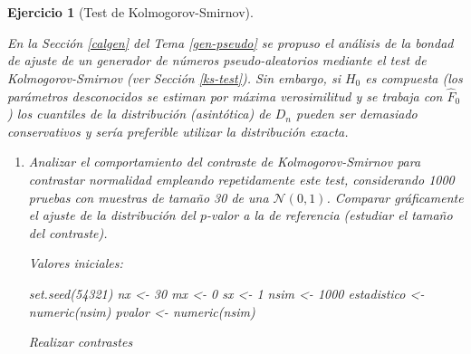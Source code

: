 \documentclass[
]{book}
\newenvironment{Shaded}{\begin{snugshade}}{\end{snugshade}}
\newcommand{\ControlFlowTok}[1]{\textcolor[rgb]{0.13,0.29,0.53}{\textbf{#1}}}
\newcommand{\DecValTok}[1]{\textcolor[rgb]{0.00,0.00,0.81}{#1}}
\newcommand{\FunctionTok}[1]{\textcolor[rgb]{0.00,0.00,0.00}{#1}}
\newcommand{\NormalTok}[1]{#1}
\newcommand{\OtherTok}[1]{\textcolor[rgb]{0.56,0.35,0.01}{#1}}
\newcommand{\SpecialCharTok}[1]{\textcolor[rgb]{0.00,0.00,0.00}{#1}}
\newcommand{\StringTok}[1]{\textcolor[rgb]{0.31,0.60,0.02}{#1}}
\theoremstyle{break}
\newtheorem{exercise}{Ejercicio}[chapter]
\theoremstyle{nonumberplain}
\begin{document}
\begin{exercise}[Test de Kolmogorov-Smirnov]
\protect\hypertarget{exr:ks-test-sim}{}\label{exr:ks-test-sim}

En la Sección \ref{calgen} del Tema \ref{gen-pseudo} se propuso el análisis de la bondad de ajuste de un generador de números pseudo-aleatorios mediante el test de Kolmogorov-Smirnov (ver Sección \ref{ks-test}).
Sin embargo, si \(H_{0}\) es compuesta (los parámetros desconocidos se estiman por máxima verosimilitud y se trabaja con \(\hat{F}_{0}\)) los cuantiles de la distribución (asintótica) de \(D_{n}\) pueden ser demasiado conservativos y sería preferible utilizar la distribución exacta.

\begin{enumerate}
\def\labelenumi{\alph{enumi})}
\item
  Analizar el comportamiento del contraste de Kolmogorov-Smirnov
  para contrastar normalidad empleando repetidamente este test,
  considerando 1000 pruebas con muestras de tamaño 30 de
  una \(\mathcal{N}(0,1)\). Comparar gráficamente el ajuste
  de la distribución del \(p\)-valor a la de referencia
  (estudiar el tamaño del contraste).

  Valores iniciales:

\begin{Shaded}
\begin{Highlighting}[]
\FunctionTok{set.seed}\NormalTok{(}\DecValTok{54321}\NormalTok{)}
\NormalTok{nx }\OtherTok{\textless{}{-}} \DecValTok{30}
\NormalTok{mx }\OtherTok{\textless{}{-}} \DecValTok{0}
\NormalTok{sx }\OtherTok{\textless{}{-}} \DecValTok{1}
\NormalTok{nsim }\OtherTok{\textless{}{-}} \DecValTok{1000}
\NormalTok{estadistico }\OtherTok{\textless{}{-}} \FunctionTok{numeric}\NormalTok{(nsim)}
\NormalTok{pvalor }\OtherTok{\textless{}{-}} \FunctionTok{numeric}\NormalTok{(nsim)}
\end{Highlighting}
\end{Shaded}

  Realizar contrastes

\begin{Shaded}
\end{Shaded}


\end{enumerate}
\end{exercise}
\end{document}
